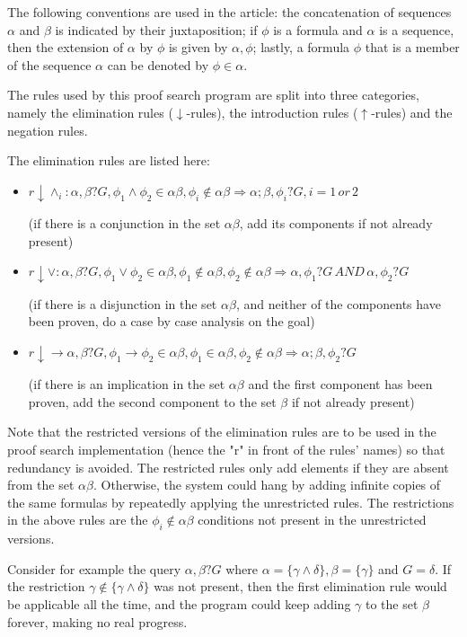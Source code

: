 \documentclass[11pt,twoside,a4paper]{report}
\begin{document}
The following conventions are used in the article: the concatenation of sequences $\alpha$ and $\beta$ is indicated by their juxtaposition; if $\phi$ is a formula and $\alpha$ is a sequence, then the extension of $\alpha$ by $\phi$ is given by $\alpha,\phi$; lastly, a formula $\phi$ that is a member of the sequence $\alpha$ can be denoted by $\phi \in \alpha$.

The rules used by this proof search program are split into three categories, namely the elimination rules ($\downarrow$-rules), the introduction rules ($\uparrow$-rules) and the negation rules. 

The elimination rules are listed here:
\begin{itemize}
\item
$r\downarrow\wedge_i:\alpha,\beta?G, \phi_1\wedge\phi_2 \in \alpha\beta, \phi_i \notin \alpha\beta \Rightarrow \alpha;\beta,\phi_i?G, i = 1\, or\, 2$

(if there is a conjunction in the set $\alpha\beta$, add its components if not already present)
\item
$r\downarrow\vee:\alpha,\beta?G, \phi_1\vee\phi_2 \in \alpha\beta, \phi_1 \notin \alpha\beta, \phi_2 \notin \alpha\beta \Rightarrow \alpha,\phi_1?G\, AND\, \alpha,\phi_2?G$

(if there is a disjunction in the set $\alpha\beta$, and neither of the components have been proven, do a case by case analysis on the goal)
\item
$r\downarrow\rightarrow\alpha,\beta?G, \phi_1\rightarrow\phi_2 \in \alpha\beta, \phi_1 \in \alpha\beta, \phi_2 \notin \alpha\beta \Rightarrow \alpha;\beta,\phi_2?G$

(if there is an implication in the set $\alpha\beta$ and the first component has been proven, add the second component to the set $\beta$ if not already present)
\end{itemize}

Note that the restricted versions of the elimination rules are to be used in the proof search implementation (hence the "r" in front of the rules' names) so that redundancy is avoided. The restricted rules only add elements if they are absent from the set $\alpha\beta$. Otherwise, the system could hang by adding infinite copies of the same formulas by repeatedly applying the unrestricted rules. The restrictions in the above rules are the $\phi_i \notin \alpha\beta$ conditions not present in the unrestricted versions.

Consider for example the query $\alpha,\beta?G$ where $\alpha = \{\gamma\wedge\delta\}, \beta = \{\gamma\}$ and $G = \delta$. If the restriction $\gamma \notin \{\gamma\wedge\delta\}$ was not present, then the first elimination rule would be applicable all the time, and the program could keep adding $\gamma$ to the set $\beta$ forever, making no real progress.
\end{document}
